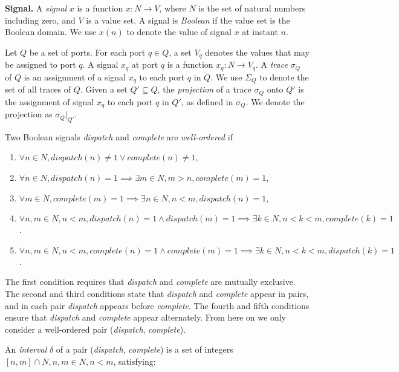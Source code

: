 {\bf Signal.}
A \emph{signal} $x$ is a function $x: N \rightarrow V$, where $N$ is the set of natural numbers including zero, and $V$ is a value set. 
A signal is \emph{Boolean} if the value set is the Boolean domain.
We use $x(n)$ to denote the value of signal $x$ at instant $n$. 

Let $Q$ be a set of ports. 
For each port $q \in Q$, a set $V_q$ denotes the values that may be assigned to port $q$. 
A signal $x_q$ at port $q$ is a function $x_q: N \rightarrow V_q$.
A \emph{trace} $\sigma_Q$ of $Q$ is an assignment of a signal $x_q$ to each port $q$ in $Q$.
We use $\Sigma_Q$ to denote the set of all traces of $Q$.
Given a set $Q' \subseteq Q$, the \emph{projection} of a trace $\sigma_Q$ onto $Q'$ is the assignment of signal $x_q$ to each port $q$ in $Q'$, as defined in $\sigma_Q$. We denote the projection as $\sigma_Q|_{Q'}$.
 
Two Boolean signals \emph{dispatch} and \emph{complete} are \emph{well-ordered} if 

\begin{enumerate}
	\item $\forall n \in N, dispatch(n) \ne 1 \vee complete(n) \ne 1 $,
	\item $ \forall n\in N, dispatch(n) = 1 \implies \exists m\in N, m > n, complete(m) =  1 $,
	\item $ \forall m\in N, complete(m) = 1 \implies \exists n\in N, n < m, dispatch(n) =  1 $,
	\item $ \forall n,m\in N, n < m, dispatch(n) = 1 \wedge dispatch(m) = 1 \implies \exists k\in N, n < k < m, complete(k) = 1 $.
	\item $ \forall n,m\in N, n < m, complete(n) = 1 \wedge complete(m) = 1 \implies \exists k\in N, n < k < m, dispatch(k) = 1 $.
\end{enumerate}

The first condition requires that \emph{dispatch} and \emph{complete} are mutually exclusive. The second and third conditions state that \emph{dispatch} and \emph{complete} appear in pairs, and in each pair \emph{dispatch} appears before \emph{complete}. The fourth and fifth conditions ensure that \emph{dispatch} and \emph{complete} appear alternately. 
From here on we only consider a well-ordered pair (\emph{dispatch}, \emph{complete}).

An \emph{interval} $\delta$ of a pair (\emph{dispatch}, \emph{complete}) is a set of integers $[n, m] \cap N, n,m \in N, n < m$, satisfying:

